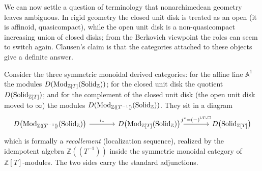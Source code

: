 We can now settle a question of terminology that nonarchimedean geometry
leaves ambiguous. In rigid geometry the closed unit disk is treated as an open
(it is affinoid, quasicompact), while the open unit disk is a non-quasicompact
increasing union of closed disks; from the Berkovich viewpoint the roles can
seem to switch again. Clausen's claim is that the categories attached to these
objects give a definite answer.

Consider the three symmetric monoidal derived categories: for the affine line
$\mathbb{A}^1$ the modules $D(\mathrm{Mod}_{\mathbb{Z}[T]}(\mathrm{Solid}_{\mathbb{Z}}))$;
for the closed unit disk the quotient $D(\mathrm{Solid}_{\mathbb{Z}[T]})$; and for the
complement of the closed unit disk (the open unit disk moved to $\infty$) the
modules $D(\mathrm{Mod}_{\mathbb{Z}(\!(T^{-1})\!)}(\mathrm{Solid}_{\mathbb{Z}}))$. They
sit in a diagram
\begin{equation}
\label{eq:7:recollement}
\begin{tikzcd}[column sep=large]
D\bigl(\mathrm{Mod}_{\mathbb{Z}(\!(T^{-1})\!)}(\Solid_{\mathbb{Z}})\bigr)
\arrow[r, "i_{*}"]
& D\bigl(\mathrm{Mod}_{\mathbb{Z}[T]}(\Solid_{\mathbb{Z}})\bigr)
\arrow[r, "j^{*}=(-)^{\LTsolid}"]
& D\bigl(\Solid_{\mathbb{Z}[T]}\bigr)
\end{tikzcd}
\end{equation}
which is formally a \emph{recollement} (localization sequence), realized by the
idempotent algebra $\mathbb{Z}(\!(T^{-1})\!)$ inside the symmetric monoidal
category of $\mathbb{Z}[T]$-modules. The two sides carry the standard
adjunctions.

